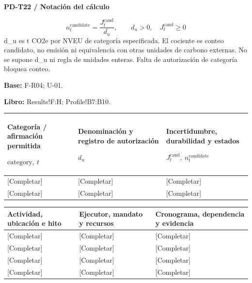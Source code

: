 \par\begingroup\sffamily\fontsize{8}{10}\selectfont\color{NEBGreen}\setlength{\parskip}{2pt}\setlength{\abovedisplayskip}{4pt}\setlength{\belowdisplayskip}{4pt}\setlength{\abovedisplayshortskip}{2pt}\setlength{\belowdisplayshortskip}{3pt}
\textbf{PD-T22 / Notación del cálculo}\par
{\fontsize{9}{11}\selectfont\[ n_t^{\mathrm{candidate}}=\frac{J_t^{\mathrm{cand}}}{d_u},\qquad d_u>0,\quad J_t^{\mathrm{cand}}\ge0 \]}
d\_u es t CO2e por NVEU de categoría especificada. El cociente es conteo candidato, no emisión ni equivalencia con otras unidades de carbono externas. No se supone d\_u ni regla de unidades enteras. Falta de autorización de categoría bloquea conteo.\par
\textbf{Base:} F-R04; U-01.\par
\textbf{Libro:} Results!F:H; Profile!B7:B10.\par\endgroup
{\sffamily\fontsize{8.3}{10.3}\selectfont\begin{longtable}{@{}P{51.14mm} P{56.09mm} P{57.74mm}@{}}
\toprule
\textbf{Categoría / afirmación permitida}\par {\normalfont\fontsize{8.2}{10}\selectfont $\text{category},\ t$} & \textbf{Denominación y registro de autorización}\par {\normalfont\fontsize{8.2}{10}\selectfont $d_u$} & \textbf{Incertidumbre, durabilidad y estados}\par {\normalfont\fontsize{8.2}{10}\selectfont $J_t^{\mathrm{cand}},\ n_t^{\mathrm{candidate}}$}\\\midrule\endhead
\rule{0pt}{7.7mm}[Completar] & [Completar] & [Completar]\\\hline
\rule{0pt}{7.7mm}[Completar] & [Completar] & [Completar]\\\hline
\end{longtable}}
{\sffamily\fontsize{8.3}{10.3}\selectfont\begin{longtable}{@{}P{56.09mm} P{56.09mm} P{52.79mm}@{}}
\toprule
\textbf{Actividad, ubicación e hito} & \textbf{Ejecutor, mandato y recursos} & \textbf{Cronograma, dependencia y evidencia}\\\midrule\endhead
\rule{0pt}{7.7mm}[Completar] & [Completar] & [Completar]\\\hline
\rule{0pt}{7.7mm}[Completar] & [Completar] & [Completar]\\\hline
\rule{0pt}{7.7mm}[Completar] & [Completar] & [Completar]\\\hline
\rule{0pt}{7.7mm}[Completar] & [Completar] & [Completar]\\\hline
\end{longtable}}
